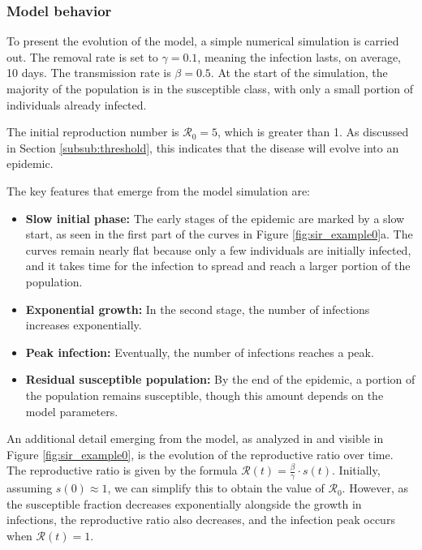\subsubsection{Model behavior}

To present the evolution of the model, a simple numerical simulation is carried out. The removal rate is set to $\gamma = 0.1$, meaning the infection lasts, on average, 10 days. The transmission rate is $\beta = 0.5$. At the start of the simulation, the majority of the population is in the susceptible class, with only a small portion of individuals already infected.

The initial reproduction number is  $\mathcal{R}_0 = 5$, which is greater than 1. As discussed in Section \ref{subsub:threshold}, this indicates that the disease will evolve into an epidemic.

The key features that emerge from the model simulation are:

\begin{itemize}
	\item \textbf{Slow initial phase:} The early stages of the epidemic are marked by a slow start, as seen in the first part of the curves in Figure \ref{fig:sir_example0}a. The curves remain nearly flat because only a few individuals are initially infected, and it takes time for the infection to spread and reach a larger portion of the population.
	\item \textbf{Exponential growth:} In the second stage, the number of infections increases exponentially.
	\item \textbf{Peak infection:} Eventually, the number of infections reaches a peak.
	\item \textbf{Residual susceptible population:} By the end of the epidemic, a portion of the population remains susceptible, though this amount depends on the model parameters.
\end{itemize}

An additional detail emerging from the model, as analyzed in \cite{Okabe_2020} and visible in Figure \ref{fig:sir_example0}, is the evolution of the reproductive ratio over time. The reproductive ratio is given by the formula $\mathcal{R}(t) = \frac{\beta}{\gamma} \cdot s(t)$. Initially, assuming $s(0)\approx 1$, we can simplify this to obtain the value of $\mathcal{R}_0$. However, as the susceptible fraction decreases exponentially alongside the growth in infections, the reproductive ratio also decreases, and the infection peak occurs when $\mathcal{R}(t)=1$.



